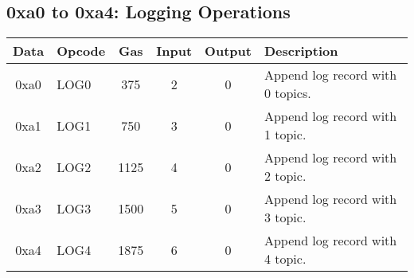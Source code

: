 \documentclass[10pt,a4paper,leqno,bibliography=totoc]{scrartcl}
\newenvironment{alphafootnotes}
{\par\edef\savedfootnotenumber{\number\value{footnote}}
\renewcommand{\thefootnote}{\alph{footnote}}
\setcounter{footnote}{0}}
{\par\setcounter{footnote}{\savedfootnotenumber}}
\begin{document}
\begin{alphafootnotes}
		\subsection{0xa0 to 0xa4: Logging Operations}
			\begin{longtable}{|cP{2.8cm}cccp{6cm}|}
		        \hline  
		        \textbf{Data} & \textbf{Opcode} & \textbf{Gas}  & \textbf{Input}  & \textbf{Output} & \textbf{Description} \\
		        \hline  
			0xa0 & LOG0 & 375 & 2 & 0 & Append log record with 0 topics. \\
			0xa1 & LOG1 & 750 & 3 & 0 & Append log record with 1 topic. \\
			0xa2 & LOG2 & 1125 & 4 & 0 & Append log record with 2 topic. \\
			0xa3 & LOG3 & 1500 & 5 & 0 & Append log record with 3 topic. \\
			0xa4 & LOG4 & 1875 & 6 & 0 & Append log record with 4 topic. \\
			\hline
			\end{longtable}


\end{alphafootnotes}
\end{document}
